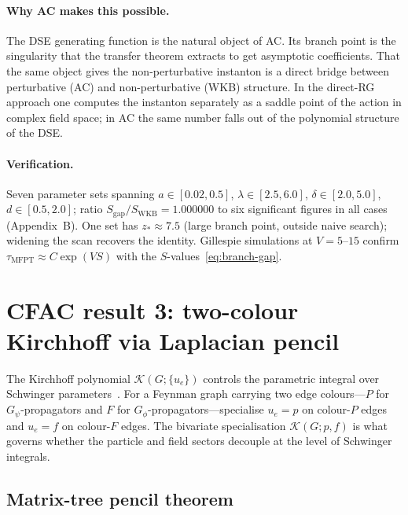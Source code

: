 \documentclass[11pt,a4paper]{article}
\theoremstyle{plain}
\begin{document}
\paragraph{Why AC makes this possible.}
The DSE generating function is the natural object of AC.  Its
branch point is the singularity that the transfer theorem
extracts to get asymptotic coefficients.  That the same object
gives the non-perturbative instanton is a direct bridge between
perturbative (AC) and non-perturbative (WKB) structure.  In the
direct-RG approach one computes the instanton separately as a
saddle point of the action in complex field space; in AC the
same number falls out of the polynomial structure of the DSE.

\paragraph{Verification.}
Seven parameter sets spanning $a \in [0.02, 0.5]$,
$\lambda \in [2.5, 6.0]$, $\delta \in [2.0, 5.0]$,
$d \in [0.5, 2.0]$; ratio $S_{\mathrm{gap}}/S_{\mathrm{WKB}} =
1.000000$ to six significant figures in all cases (Appendix~B).
One set has $z_* \approx 7.5$ (large branch point, outside naive
search); widening the scan recovers the identity.  Gillespie
simulations at $V = 5$--$15$ confirm
$\tau_{\mathrm{MFPT}} \approx C\exp(VS)$ with the
$S$-values~\eqref{eq:branch-gap}.

\section{CFAC result 3: two-colour Kirchhoff via Laplacian pencil}
\label{sec:kirchhoff}

The Kirchhoff polynomial $\mathcal{K}(G;\{u_e\})$ controls the
parametric integral over Schwinger parameters~\cite{BognerWeinzierl}.
For a Feynman graph carrying two edge colours---$P$ for
$G_\psi$-propagators and $F$ for $G_\phi$-propagators---specialise
$u_e = p$ on colour-$P$ edges and $u_e = f$ on colour-$F$ edges.
The bivariate specialisation $\mathcal{K}(G; p, f)$ is what governs
whether the particle and field sectors decouple at the level of
Schwinger integrals.

\subsection{Matrix-tree pencil theorem}
\end{document}
